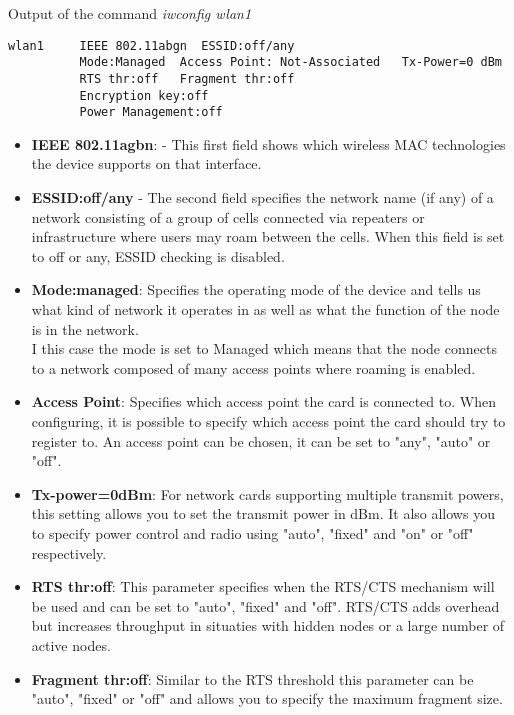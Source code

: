 Output of the command \textit{iwconfig wlan1}
\begin{verbatim}
wlan1     IEEE 802.11abgn  ESSID:off/any
          Mode:Managed  Access Point: Not-Associated   Tx-Power=0 dBm
          RTS thr:off   Fragment thr:off
          Encryption key:off
          Power Management:off
\end{verbatim}
\begin{itemize}
\item \textbf{IEEE 802.11agbn}: - This first field shows which wireless MAC technologies the device supports on that interface.\\
%
\item \textbf{ESSID:off/any}	- The second field specifies the network name (if any) of a network consisting of a group of cells connected via repeaters or infrastructure
 where users may roam between the cells. When this field is set to off or any, ESSID checking is disabled.\\
%
\item \textbf{Mode:managed}: Specifies the operating mode of the device and tells us what kind of network it operates in as well as what the function of the node is in the network.\\
I this case the mode is set to Managed which means that the node connects to a network composed of many access points where roaming is enabled.\\
%
\item \textbf{Access Point}: Specifies which access point the card is connected to. When configuring, it is possible to specify which access point the card should try to register to.
An access point can be chosen, it can be set to "any", "auto" or "off".
%
\item \textbf{Tx-power=0dBm}: For network cards supporting multiple transmit powers, this setting allows you to set the transmit power in dBm.
It also allows you to specify power control and radio using "auto", "fixed" and "on" or "off" respectively.\\
%
\item \textbf{RTS thr:off}: This parameter specifies when the RTS/CTS mechanism will be used and can be set to "auto", "fixed" and "off".
 RTS/CTS adds overhead but increases throughput in situaties with hidden nodes or a large number of active nodes.\\
%
\item \textbf{Fragment thr:off}: Similar to the RTS threshold this parameter can be "auto", "fixed" or "off" and allows you to specify the maximum fragment size.

\end{itemize}
